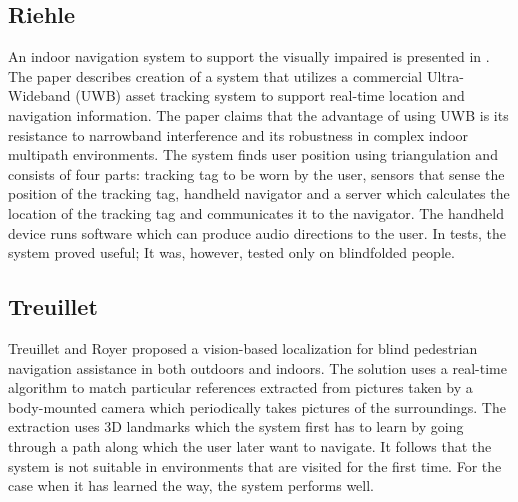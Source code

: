 \subsection{Riehle}
An indoor navigation system to support the visually impaired is presented in \cite{riehle}. The paper describes creation of a system that utilizes a commercial Ultra-Wideband (UWB) asset tracking system to support real-time location and navigation information. The paper claims that the advantage of using UWB is its resistance to narrowband interference and its  robustness in complex indoor multipath environments. The system finds user position using triangulation and consists of four parts: tracking tag to be worn by the user, sensors that sense the position of the tracking tag, handheld navigator and a server which calculates the location of the tracking tag and communicates it to the navigator. The handheld device runs software which can produce audio directions to the user. In tests, the system proved useful; It was, however, tested only on blindfolded people.\\

\subsection{Treuillet}
Treuillet and Royer \cite{sylvie} proposed a vision-based localization for blind pedestrian navigation assistance in both outdoors and indoors. The solution uses a real-time algorithm to match particular references extracted from pictures taken by a body-mounted camera which periodically takes pictures of the surroundings. The extraction uses 3D landmarks which the system first has to learn by going through a path along which the user later want to navigate. It follows that the system is not suitable in environments that are visited for the first time. For the case when it has learned the way, the system performs well.

